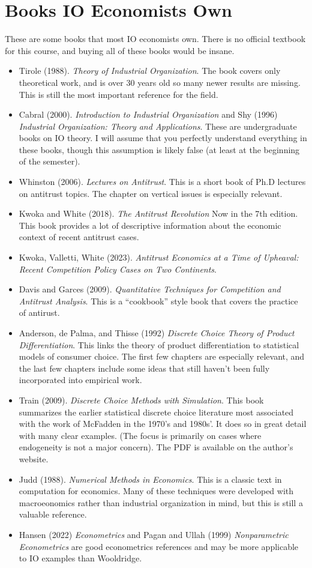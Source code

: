 \documentclass[11pt]{article}
\begin{document}
\section*{Books IO Economists Own}
These are some books that most IO economists own. There is no official textbook for this course, and buying all of these books would be insane.
\begin{itemize}
\item Tirole (1988). \textit{Theory of Industrial Organization}. The book covers only theoretical work, and is over 30 years old so many newer results are missing. This is still the most important reference for the field.
\item Cabral (2000). \textit{Introduction to Industrial Organization} and Shy (1996) \textit{Industrial Organization: Theory and Applications}. These are undergraduate books on IO theory. I will assume that you perfectly understand everything in these books, though this assumption is likely false (at least at the beginning of the semester).
\item Whinston (2006). \textit{Lectures on Antitrust}. This is a short book of Ph.D lectures on antitrust topics. The chapter on vertical issues is especially relevant.
\item Kwoka and White (2018). \textit{The Antitrust Revolution} Now in the 7th edition. This book provides a lot of descriptive information about the economic context of recent antitrust cases.
\item Kwoka, Valletti, White (2023). \textit{Antitrust Economics at a Time of Upheaval: Recent Competition Policy Cases on Two Continents}.
\item Davis and Garces (2009). \textit{Quantitative Techniques for Competition and Antitrust Analysis}. This is a ``cookbook'' style book that covers the practice of antirust.
\item Anderson, de Palma, and Thisse (1992) \textit{Discrete Choice Theory of Product Differentiation}. This links the theory of product differentiation to statistical models of consumer choice. The first few chapters are especially relevant, and the last few chapters include some ideas that still haven't been fully incorporated into empirical work.
\item Train (2009). \textit{Discrete Choice Methods with Simulation}. This book summarizes the earlier statistical discrete choice literature most associated with the work of McFadden in the 1970's and 1980s'. It does so in great detail with many clear examples. (The focus is primarily on cases where endogeneity is not a major concern). The PDF is available on the author's website.
\item Judd (1988). \textit{Numerical Methods in Economics}. This is a classic text in computation for economics. Many of these techniques were developed with macroeonomics rather than industrial organization in mind, but this is still a valuable reference.
\item Hansen (2022) \textit{Econometrics} and Pagan and Ullah (1999) \textit{Nonparametric Econometrics} are good econometrics references and may be more applicable to IO examples than Wooldridge.

\end{itemize}
\end{document}
